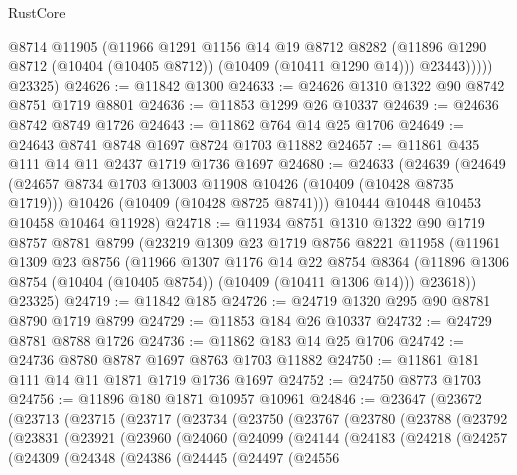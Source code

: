 \begin{lexlean}{RustCore}
\begin{coremodule}
              @8714
              @11905
              (@11966
                @1291
                @1156
                @14
                @19
                @8712
                @8282
                (@11896 @1290 @8712 (@10404 (@10405 @8712)) (@10409 (@10411 @1290 @14)))
                @23443)))))
      @23325)
@24626 := @11842 @1300
@24633 := @24626 @1310 @1322 @90 @8742 @8751 @1719 @8801
@24636 := @11853 @1299 @26 @10337
@24639 := @24636 @8742 @8749 @1726
@24643 := @11862 @764 @14 @25 @1706
@24649 := @24643 @8741 @8748 @1697 @8724 @1703 @11882
@24657 := @11861 @435 @111 @14 @11 @2437 @1719 @1736 @1697
@24680 := @24633
    (@24639
      (@24649
        (@24657 @8734 @1703 @13003 @11908 @10426 (@10409 (@10428 @8735 @1719)))
        @10426
        (@10409 (@10428 @8725 @8741)))
      @10444
      @10448
      @10453
      @10458
      @10464
      @11928)
@24718 := @11934
    @8751
    @1310
    @1322
    @90
    @1719
    @8757
    @8781
    @8799
    (@23219
      @1309
      @23
      @1719
      @8756
      @8221
      @11958
      (@11961
        @1309
        @23
        @8756
        (@11966
          @1307
          @1176
          @14
          @22
          @8754
          @8364
          (@11896 @1306 @8754 (@10404 (@10405 @8754)) (@10409 (@10411 @1306 @14)))
          @23618))
      @23325)
@24719 := @11842 @185
@24726 := @24719 @1320 @295 @90 @8781 @8790 @1719 @8799
@24729 := @11853 @184 @26 @10337
@24732 := @24729 @8781 @8788 @1726
@24736 := @11862 @183 @14 @25 @1706
@24742 := @24736 @8780 @8787 @1697 @8763 @1703 @11882
@24750 := @11861 @181 @111 @14 @11 @1871 @1719 @1736 @1697
@24752 := @24750 @8773 @1703
@24756 := @11896 @180 @1871 @10957 @10961
@24846 := @23647
    (@23672
      (@23713
        (@23715
          (@23717
            (@23734
              (@23750
                (@23767
                  (@23780
                    (@23788
                      (@23792
                        (@23831
                          (@23921
                            (@23960
                              (@24060
                                (@24099
                                  (@24144
                                    (@24183
                                      (@24218
                                        (@24257
                                          (@24309
                                            (@24348
                                              (@24386
                                                (@24445
                                                  (@24497
                                                    (@24556

\end{coremodule}
\end{lexlean}
